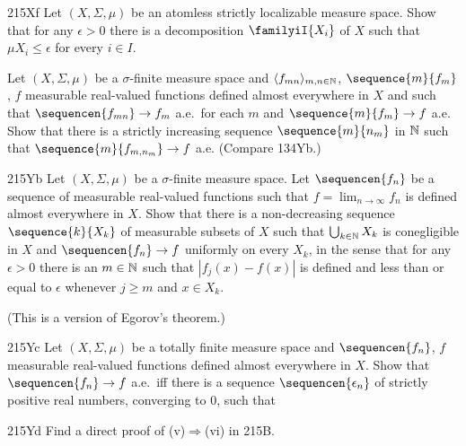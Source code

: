 {\spheader 215Xf Let $(X,\Sigma,\mu)$ be an atomless strictly localizable 
measure space.   Show that for any $\epsilon>0$ there is a decomposition 
$\familyiI{X_i}$ of $X$ such that $\mu X_i\le\epsilon$ for every 
$i\in I$. 
      
Let $(X,\Sigma,\mu)$ be a $\sigma$-finite measure space 
and $\langle f_{mn}\rangle_{m,n\in\Bbb N}$, $\sequence{m}{f_m}$, $f$ 
measurable real-valued functions defined almost everywhere in $X$ and 
such that $\sequencen{f_{mn}}\to f_m$ a.e.\ for 
each $m$ and $\sequence{m}{f_m}\to f$ a.e.   Show that there is a 
strictly increasing sequence $\sequence{m}{n_m}$ in $\Bbb N$ such that 
$\sequence{m}{f_{m,n_m}}\to f$ a.e.   (Compare 134Yb.) 
      
\spheader 215Yb Let $(X,\Sigma,\mu)$ be a $\sigma$-finite measure space. 
Let $\sequencen{f_n}$ be a sequence of measurable real-valued functions 
such that $f=\lim_{n\to\infty}f_n$ is defined almost everywhere in $X$. 
Show that there is a non-decreasing sequence $\sequence{k}{X_k}$ of 
measurable subsets of $X$ such that $\bigcup_{k\in\Bbb N}X_k$ is 
conegligible in $X$ and $\sequencen{f_n}\to f$ uniformly on every $X_k$, 
in the sense that for any $\epsilon>0$ there is an $m\in\Bbb N$ such 
that $|f_j(x)-f(x)|$ is defined and less than or equal to $\epsilon$ 
whenever $j\ge m$ and $x\in X_k$. 
      
(This is a version of Egorov's theorem.) 
      
\spheader 215Yc Let $(X,\Sigma,\mu)$ be a totally finite measure space 
and $\sequencen{f_n}$, $f$ measurable real-valued functions defined 
almost everywhere in $X$.   Show that $\sequencen{f_n}\to f$ a.e.\ iff 
there is a sequence $\sequencen{\epsilon_n}$ of strictly positive real 
numbers, converging to $0$, such that 
      
      
\spheader 215Yd Find a direct proof of (v)$\Rightarrow$(vi) in 215B. 

}%
      
